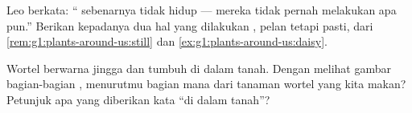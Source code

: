 \begin{exercise}[$\star\star$]\label{exo:g1:plants-around-us:9}
Leo berkata: `` sebenarnya tidak hidup --- mereka tidak pernah
melakukan apa pun.'' Berikan kepadanya dua hal yang dilakukan
, pelan tetapi pasti, dari
\cref{rem:g1:plants-around-us:still} dan
\cref{ex:g1:plants-around-us:daisy}.
\end{exercise}

\begin{exercise}[$\star\star$]\label{exo:g1:plants-around-us:10}
Wortel berwarna jingga dan tumbuh di dalam tanah. Dengan melihat
gambar bagian-bagian , menurutmu bagian mana dari tanaman
wortel yang kita makan? Petunjuk apa yang diberikan kata ``di dalam
tanah''?
\end{exercise}
